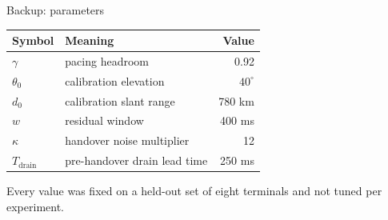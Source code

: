 \documentclass[aspectratio=169,10pt]{beamer}
\begin{document}
\begin{frame}{Backup: parameters}
  \begin{table}
    \centering
    \small
    \begin{tabular}{llr}
      \toprule
      Symbol & Meaning & Value \\
      \midrule
      $\gamma$          & pacing headroom                & 0.92 \\
      $\theta_0$        & calibration elevation          & $40^{\circ}$ \\
      $d_0$             & calibration slant range        & 780 km \\
      $w$               & residual window                & 400 ms \\
      $\kappa$          & handover noise multiplier      & 12 \\
      $T_{\text{drain}}$ & pre-handover drain lead time  & 250 ms \\
      \bottomrule
    \end{tabular}
  \end{table}
  \vspace{0.4em}
  \footnotesize
  Every value was fixed on a held-out set of eight terminals and not tuned per experiment.
\end{frame}
\end{document}
